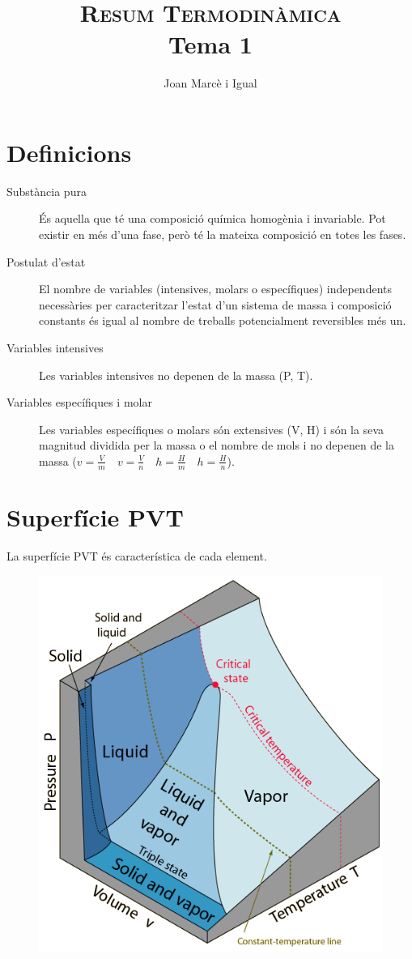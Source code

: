 \documentclass[a4paper]{article}
\title{
	\textsc{Resum Termodinàmica} \\
	Tema 1
}
\author{Joan Marcè i Igual}
\begin{document}
\maketitle

\section{Definicions}

\begin{description}
	\item[Substància pura] És aquella que té una composició química homogènia i invariable. Pot existir en més d'una fase, però té la mateixa composició en totes les fases.
	\item[Postulat d'estat] El nombre de variables (intensives, molars o específiques) independents necessàries per caracteritzar l'estat d'un sistema de massa i composició constants és igual al nombre de treballs potencialment reversibles més un.
	\item[Variables intensives] Les variables intensives no depenen de la massa (P, T).
	\item[Variables específiques i molar] Les variables específiques o molars són extensives (V, H) i són la seva magnitud dividida per la massa o el nombre de mols i no depenen de la massa ($v = \frac{V}{m} \quad v = \frac{V}{n} \quad h = \frac{H}{m} \quad h = \frac{H}{n}$).
\end{description}

\section{Superfície PVT}

La superfície PVT és característica de cada element.

\begin{figure}[H]
	\centering
	\includegraphics[width=0.5\linewidth]{superficie_PVT}
\end{figure}
\end{document}
